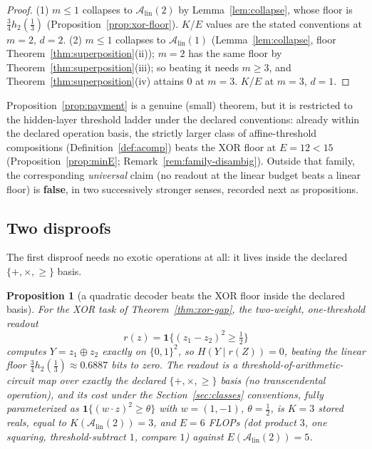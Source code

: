 \documentclass[twocolumn,10pt]{article}
\newtheorem{proposition}[theorem]{Proposition}
\theoremstyle{definition}
\theoremstyle{remark}
\newcommand{\cA}{\mathcal{A}}
\newcommand{\Alin}{\cA_{\mathrm{lin}}}
\newcommand{\hb}{h_2}
\begin{document}
\begin{proof}
(1) $m \le 1$ collapses to $\Alin(2)$ by Lemma~\ref{lem:collapse}, whose
floor is $\tfrac34 \hb(\tfrac13)$ (Proposition~\ref{prop:xor-floor}).
$K$/$E$ values are the stated conventions at $m = 2$, $d = 2$.
(2) $m \le 1$ collapses to $\Alin(1)$ (Lemma~\ref{lem:collapse}, floor
Theorem~\ref{thm:superposition}(ii)); $m = 2$ has the same floor by
Theorem~\ref{thm:superposition}(iii); so beating it needs $m \ge 3$, and
Theorem~\ref{thm:superposition}(iv) attains $0$ at $m = 3$. $K$/$E$ at
$m = 3$, $d = 1$.
\end{proof}

Proposition~\ref{prop:payment} is a genuine (small) theorem, but it
is restricted to the hidden-layer threshold ladder under the declared
conventions: already within the declared operation basis, the
strictly larger class of affine-threshold compositions
(Definition~\ref{def:acomp}) beats the XOR floor at $E = 12 < 15$
(Proposition~\ref{prop:minE}; Remark~\ref{rem:family-disambig}).
Outside that family, the corresponding \emph{universal} claim (no
readout at the linear budget beats a linear floor) is
\textbf{false}, in two successively stronger senses, recorded next as
propositions.

\subsection{Two disproofs}
\label{sec:disproofs}

The first disproof needs no exotic operations at all: it lives inside the
declared $\{+, \times, \ge\}$ basis.

\begin{proposition}[a quadratic decoder beats the XOR floor inside the
declared basis]
\label{prop:quadratic}
For the XOR task of Theorem~\ref{thm:xor-gap}, the two-weight,
one-threshold readout
\[
r(z) = \mathbf 1\big\{(z_1 - z_2)^2 \ge \tfrac12\big\}
\]
\sloppy
computes $Y = z_1 \oplus z_2$ exactly on $\{0,1\}^2$, so
$H(Y \mid r(Z)) = 0$, beating the linear floor $\tfrac34 \hb(\tfrac13)
\approx 0.6887$ bits to zero. The readout is a
threshold-of-arithmetic-circuit map over exactly the declared
$\{+, \times, \ge\}$ basis (no transcendental operation), and its cost
under the Section~\ref{sec:classes} conventions, fully parameterized as
$\mathbf 1\{(w \cdot z)^2 \ge \theta\}$ with $w = (1, -1)$,
$\theta = \tfrac12$, is $K = 3$ stored reals, equal to
$K(\Alin(2)) = 3$, and $E = 6$ FLOPs (dot product $3$, one squaring,
threshold-subtract $1$, compare $1$) against $E(\Alin(2)) = 5$.
\end{proposition}
\end{document}
